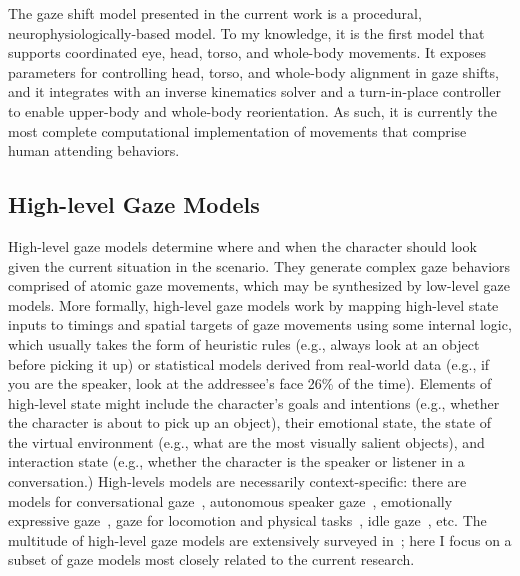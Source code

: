 The gaze shift model presented in the current work is a procedural, neurophysiologically-based model. To my knowledge, it is the first model that supports coordinated eye, head, torso, and whole-body movements. It exposes parameters for controlling head, torso, and whole-body alignment in gaze shifts, and it integrates with an inverse kinematics solver and a turn-in-place controller to enable upper-body and whole-body reorientation. As such, it is currently the most complete computational implementation of movements that comprise human attending behaviors.

\subsection{High-level Gaze Models}

High-level gaze models determine where and when the character should look given the current situation in the scenario. They generate complex gaze behaviors comprised of atomic gaze movements, which may be synthesized by low-level gaze models. More formally, high-level gaze models work by mapping high-level state inputs to timings and spatial targets of gaze movements using some internal logic, which usually takes the form of heuristic rules (e.g., always look at an object before picking it up) or statistical models derived from real-world data (e.g., if you are the speaker, look at the addressee's face 26\% of the time). Elements of high-level state might include the character's goals and intentions (e.g., whether the character is about to pick up an object), their emotional state, the state of the virtual environment (e.g., what are the most visually salient objects), and interaction state (e.g., whether the character is the speaker or listener in a conversation.) High-levels models are necessarily context-specific: there are models for conversational gaze~\cite{pelachaud2003modelling,masuko2007headeye,gratch2007rapport,andrist2013aversion,lee2007rickel}, autonomous speaker gaze~\cite{bee2010gaze,zoric2011oncreating,marsella2013virtual}, emotionally expressive gaze~\cite{queiroz2007automatic,lance2010expressive,li2012emotional}, gaze for locomotion and physical tasks~\cite{khullar2001look,mitake2007reactive,huang16planning}, idle gaze~\cite{khullar2001look,peters2003bottomup,mitake2007reactive,peters2008applying,cafaro2009animating,grillon2009crowds,kokkinara2011modelling}, etc. The multitude of high-level gaze models are extensively surveyed in~\cite{ruhland2015gazereview}; here I focus on a subset of gaze models most closely related to the current research.

